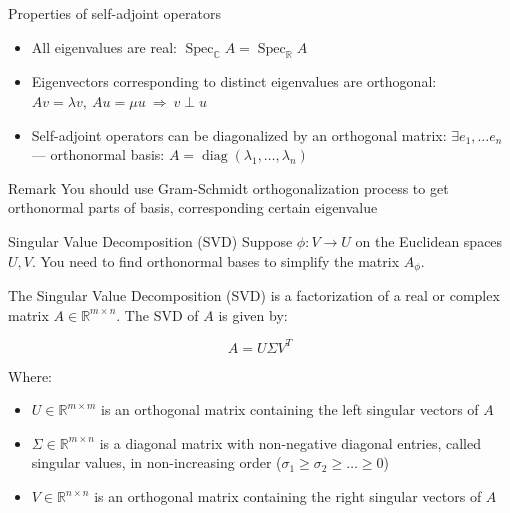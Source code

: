 \documentclass[fullscreen=true, bookmarks=true, hyperref={pdfencoding=unicode}]{beamer}
\begin{document}
\begin{frame}{Properties of self-adjoint operators}
  \begin{itemize}
    \pause\item All eigenvalues are real: 
    $\operatorname{Spec}_{\mathbb{C}} A = \operatorname{Spec}_{\mathbb{R}} A$
    \pause\item Eigenvectors corresponding to distinct eigenvalues are orthogonal:
    $Av = \lambda v,\ Au = \mu u\ \Rightarrow\ v \perp u$
    \pause\item Self-adjoint operators can be diagonalized by an orthogonal matrix:
    $\exists e_1, \dots e_n$ — orthonormal basis: 
    $A = \operatorname{diag}(\lambda_1,\dots,\lambda_n)$
  \end{itemize}

  \pause
  \begin{block}{Remark}
    You should use Gram-Schmidt orthogonalization process 
    to get orthonormal parts of basis, corresponding certain eigenvalue
  \end{block}

\end{frame}


\begin{frame}{Singular Value Decomposition (SVD)}
  Suppose $\phi: V \to U$ on the Euclidean spaces $U, V$. 
  You need to find orthonormal bases to simplify the matrix $A_\phi$.
  
  \vspace{0.5cm}
  The Singular Value Decomposition (SVD) is a factorization of a real or complex matrix $A \in \mathbb{R}^{m \times n}$. The SVD of $A$ is given by:

  \[
  A = U\Sigma V^T
  \]

  Where:
  \begin{itemize}
    \pause\item $U \in \mathbb{R}^{m \times m}$ is an orthogonal matrix containing the left singular vectors of $A$
    \pause\item $\Sigma \in \mathbb{R}^{m \times n}$ is a diagonal matrix 
    with non-negative diagonal entries, called singular values, 
    in non-increasing order ($\sigma_1 \geq \sigma_2 \geq \dots \geq 0$)
    \pause\item $V \in \mathbb{R}^{n \times n}$ is an orthogonal matrix containing the right singular vectors of $A$
  \end{itemize}
\end{frame}
\end{document}
